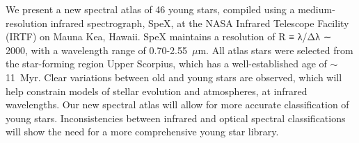 We present a new spectral atlas of 46 young stars, compiled using a medium-resolution infrared spectrograph, SpeX, at the NASA Infrared Telescope Facility (IRTF) on Mauna Kea, Hawaii.  
SpeX maintains a resolution of R ≡ λ/Δλ ∼ 2000, with a wavelength range of 0.70-2.55~$\mu$m. 
All atlas stars were selected from the star-forming region Upper Scorpius, which has a well-established age of $\sim$11~Myr. Clear variations between old and young stars are observed, which will help constrain models of stellar evolution and atmospheres, at infrared wavelengths. Our new spectral atlas will allow for more accurate classification of young stars.  Inconsistencies between infrared and optical spectral classifications will show the need for a more comprehensive young star library.